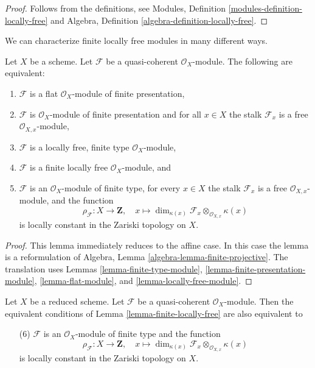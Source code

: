\begin{proof}
Follows from the definitions, see
Modules, Definition \ref{modules-definition-locally-free}
and
Algebra, Definition \ref{algebra-definition-locally-free}.
\end{proof}

\noindent
We can characterize finite locally free modules in many different ways.

\begin{lemma}
\label{lemma-finite-locally-free}
Let $X$ be a scheme.
Let $\mathcal{F}$ be a quasi-coherent $\mathcal{O}_X$-module.
The following are equivalent:
\begin{enumerate}
\item $\mathcal{F}$ is a flat $\mathcal{O}_X$-module of finite presentation,
\item $\mathcal{F}$ is $\mathcal{O}_X$-module of finite presentation and
for all $x \in X$ the stalk $\mathcal{F}_x$ is a free
$\mathcal{O}_{X, x}$-module,
\item $\mathcal{F}$ is a locally free, finite type $\mathcal{O}_X$-module,
\item $\mathcal{F}$ is a finite locally free $\mathcal{O}_X$-module, and
\item $\mathcal{F}$ is an $\mathcal{O}_X$-module of finite type,
for every $x \in X$ the stalk $\mathcal{F}_x$ is a free
$\mathcal{O}_{X, x}$-module, and the function
$$
\rho_\mathcal{F} : X \to \mathbf{Z}, \quad
x \longmapsto
\dim_{\kappa(x)} \mathcal{F}_x \otimes_{\mathcal{O}_{X, x}} \kappa(x)
$$
is locally constant in the Zariski topology on $X$.
\end{enumerate}
\end{lemma}

\begin{proof}
This lemma immediately reduces to the affine case.
In this case the lemma is a reformulation of
Algebra, Lemma \ref{algebra-lemma-finite-projective}.
The translation uses
Lemmas \ref{lemma-finite-type-module},
\ref{lemma-finite-presentation-module},
\ref{lemma-flat-module}, and
\ref{lemma-locally-free-module}.
\end{proof}

\begin{lemma}
\label{lemma-finite-locally-free-reduced}
Let $X$ be a reduced scheme. Let $\mathcal{F}$ be a quasi-coherent
$\mathcal{O}_X$-module. Then the equivalent conditions of
Lemma \ref{lemma-finite-locally-free} are also equivalent to
\begin{enumerate}
\item[(6)] $\mathcal{F}$ is an $\mathcal{O}_X$-module of finite type and
the function
$$
\rho_\mathcal{F} : X \to \mathbf{Z}, \quad
x \longmapsto
\dim_{\kappa(x)} \mathcal{F}_x \otimes_{\mathcal{O}_{X, x}} \kappa(x)
$$
is locally constant in the Zariski topology on $X$.
\end{enumerate}
\end{lemma}

